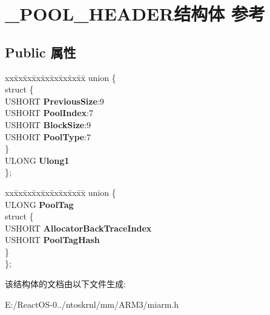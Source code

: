 \hypertarget{struct___p_o_o_l___h_e_a_d_e_r}{}\section{\+\_\+\+P\+O\+O\+L\+\_\+\+H\+E\+A\+D\+E\+R结构体 参考}
\label{struct___p_o_o_l___h_e_a_d_e_r}
\subsection*{Public 属性}
\begin{DoxyCompactItemize}
\item 
\mbox{\label{struct___p_o_o_l___h_e_a_d_e_r_ab066877019edd38eef386d0be4312c1f}} 
\begin{tabbing}
xx\=xx\=xx\=xx\=xx\=xx\=xx\=xx\=xx\=\kill
union \{\\
\mbox{\label{union___p_o_o_l___h_e_a_d_e_r_1_1_0D1465_a658f3f783b38edd06bf521f2b11e2929}} 
\>struct \{\\
\>\>USHORT {\bfseries PreviousSize}:9\\
\>\>USHORT {\bfseries PoolIndex}:7\\
\>\>USHORT {\bfseries BlockSize}:9\\
\>\>USHORT {\bfseries PoolType}:7\\
\>\} \\
\>ULONG {\bfseries Ulong1}\\
\}; \\

\end{tabbing}\item 
\mbox{\label{struct___p_o_o_l___h_e_a_d_e_r_a0760ea9d5d2623694e954099d581dc89}} 
\begin{tabbing}
xx\=xx\=xx\=xx\=xx\=xx\=xx\=xx\=xx\=\kill
union \{\\
\>ULONG {\bfseries PoolTag}\\
\mbox{\label{union___p_o_o_l___h_e_a_d_e_r_1_1_0D1467_ab99b4fc5590f6ff6c45819e7497b73fa}} 
\>struct \{\\
\>\>USHORT {\bfseries AllocatorBackTraceIndex}\\
\>\>USHORT {\bfseries PoolTagHash}\\
\>\} \\
\}; \\

\end{tabbing}\end{DoxyCompactItemize}


该结构体的文档由以下文件生成\+:\begin{DoxyCompactItemize}
\item 
E\+:/\+React\+O\+S-\/0../ntoskrnl/mm/\+A\+R\+M3/miarm.\+h\end{DoxyCompactItemize}
